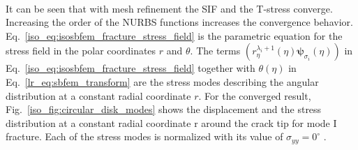 \paragraph{}
It can be seen that with mesh refinement the SIF and the T-stress converge.
Increasing the order of the NURBS functions increases the convergence behavior.
Eq.~\ref{iso_eq:isosbfem_fracture_stress_field} is the parametric equation for the stress field in the polar coordinates $r$ and $\theta$.
The terms $\left(
        r_\eta^{\lambda_i+1}(\eta)
        \boldsymbol{\psi}_{\sigma_i}(\eta)
    \right)$
in Eq.~\ref{iso_eq:isosbfem_fracture_stress_field} together with $\theta(\eta)$ in Eq.~\ref{lr_eq:sbfem_transform} are the stress modes describing the angular distribution at a constant radial coordinate $r$.
For the converged result, Fig.~\ref{iso_fig:circular_disk_modes} shows the displacement and the stress distribution at a constant radial coordinate r around the crack tip for mode \RN{1} fracture.
Each of the stress modes is normalized with its value of $\sigma_{yy}=0^\circ$ .
